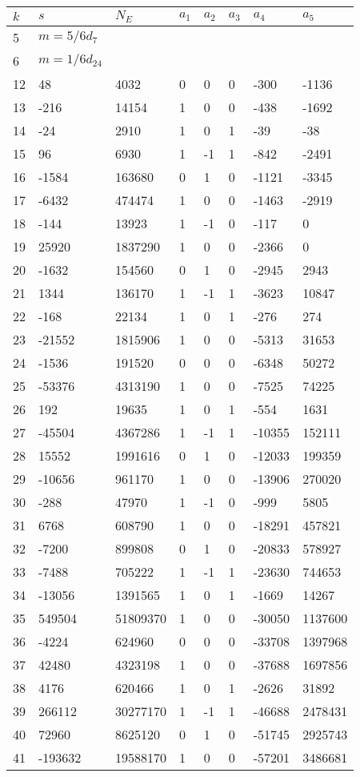 \documentclass{amsart}
\begin{document}
\begin{longtable}{|l|l|l|lllll|}
\hline
$k$ & $s$ & $N_E$ & $a_1$ & $a_2$ & $a_3$ & $a_4$ & $a_5$\\
\hline
5&$m=5/6d_{7}$&&\multicolumn{5}{c|}{}\\
6&$m=1/6d_{24}$&&\multicolumn{5}{c|}{}\\
12&48&4032&0&0&0&-300&-1136\\
13&-216&14154&1&0&0&-438&-1692\\
14&-24&2910&1&0&1&-39&-38\\
15&96&6930&1&-1&1&-842&-2491\\
16&-1584&163680&0&1&0&-1121&-3345\\
17&-6432&474474&1&0&0&-1463&-2919\\
18&-144&13923&1&-1&0&-117&0\\
19&25920&1837290&1&0&0&-2366&0\\
20&-1632&154560&0&1&0&-2945&2943\\
21&1344&136170&1&-1&1&-3623&10847\\
22&-168&22134&1&0&1&-276&274\\
23&-21552&1815906&1&0&0&-5313&31653\\
24&-1536&191520&0&0&0&-6348&50272\\
25&-53376&4313190&1&0&0&-7525&74225\\
26&192&19635&1&0&1&-554&1631\\
27&-45504&4367286&1&-1&1&-10355&152111\\
28&15552&1991616&0&1&0&-12033&199359\\
29&-10656&961170&1&0&0&-13906&270020\\
30&-288&47970&1&-1&0&-999&5805\\
31&6768&608790&1&0&0&-18291&457821\\
32&-7200&899808&0&1&0&-20833&578927\\
33&-7488&705222&1&-1&1&-23630&744653\\
34&-13056&1391565&1&0&1&-1669&14267\\
35&549504&51809370&1&0&0&-30050&1137600\\
36&-4224&624960&0&0&0&-33708&1397968\\
37&42480&4323198&1&0&0&-37688&1697856\\
38&4176&620466&1&0&1&-2626&31892\\
39&266112&30277170&1&-1&1&-46688&2478431\\
40&72960&8625120&0&1&0&-51745&2925743\\
41&-193632&19588170&1&0&0&-57201&3486681\\

\end{longtable}
\end{document}
